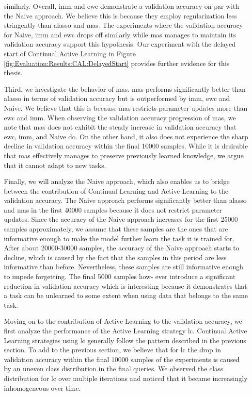 similarly. Overall, \gls{imm} and \gls{ewc} demonstrate a validation accuracy on par with the Naive approach. We believe this is because they employ regularization
less stringently than \gls{alasso} and \gls{mas}. The experiments where the validation accuracy for Naive, \gls{imm} and \gls{ewc} drops off similarly while \gls{mas}
manages to maintain its validation accuracy support this hypothesis. Our experiment with the delayed start of Continual Active Learning in Figure \ref{fig:Evaluation:Results:CAL:DelayedStart}
provides further evidence for this thesis. \par
Third, we investigate the behavior of \gls{mas}. \gls{mas} performs significantly better than \gls{alasso} in terms of validation accuracy but is outperformed by \gls{imm}, \gls{ewc} and Naive.
We believe that this is because \gls{mas} restricts parameter updates more than \gls{ewc} and \gls{imm}. When observing the validation accuracy progression of \gls{mas}, we note
that \gls{mas} does not exhibit the steady increase in validation accuracy that \gls{ewc}, \gls{imm}, and Naive do. On the other hand, it also does not experience the sharp decline in validation accuracy
within the final 10000 samples. While it is desirable that \gls{mas} effectively manages to preserve previously learned knowledge, we argue that it cannot adapt
to new tasks. \par
Finally, we will analyze the Naive approach, which also enables us to bridge between the contribution of Continual Learning and Active Learning to the validation accuracy.
The Naive approach performs significantly better than \gls{alasso} and \gls{mas} in the first 40000 samples because it does not restrict parameter updates. Since the accuracy of the Naive approach
increases for the first 25000 samples approximately, we assume that these samples are the ones that are informative enough
to make the model further learn the task it is trained for. After about 20000-30000 samples, the accuracy of the Naive approach starts to decline, which is caused
by the fact that the samples in this period are less informative than before. Nevertheless, these samples are still informative enough to impede forgetting. The final 5000 samples how-
ever introduce a significant reduction in validation accuracy which is interesting because it demonstrates that a task can be unlearned to some extent when using data that
belongs to the same task. \par
Moving on to the contribution of Active Learning to the validation accuracy, we first analyze the performance of the Active Learning strategy \gls{lc}. Continual Active
Learning strategies using \gls{lc} generally follow the pattern described in the previous section. To add to the previous section, we believe that for \gls{lc} the drop in
validation accuracy within the final 10000 samples of the experiments is caused by an uneven class distribution in the final queries. We observed the class distribution
for \gls{lc} over multiple iterations and noticed that it became increasingly inhomogeneous over time. \par


